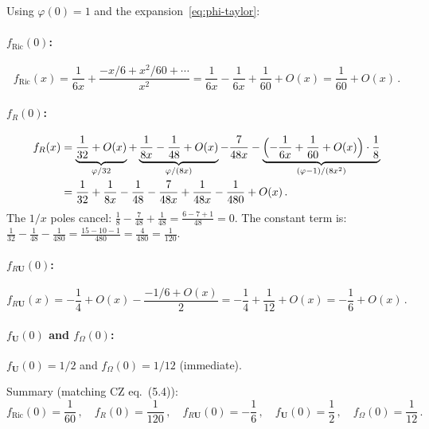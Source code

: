 \documentclass[11pt,a4paper]{article}
\theoremstyle{definition}
\theoremstyle{remark}
\begin{document}
Using $\varphi(0) = 1$ and the expansion~\eqref{eq:phi-taylor}:

\paragraph{$f_{\text{Ric}}(0)$:}
\begin{equation*}
  f_{\text{Ric}}(x) = \frac{1}{6x}
  + \frac{-x/6 + x^2/60 + \cdots}{x^2}
  = \frac{1}{6x} - \frac{1}{6x} + \frac{1}{60} + O(x)
  = \frac{1}{60} + O(x)\,.
\end{equation*}

\paragraph{$f_R(0)$:}
\begin{align*}
  f_R(x) &= \underbrace{\frac{1}{32} + O(x)}_{\varphi/32}
  + \underbrace{\frac{1}{8x} - \frac{1}{48} + O(x)}_{\varphi/(8x)}
  - \frac{7}{48x}
  - \underbrace{\Bigl(-\frac{1}{6x} + \frac{1}{60} + O(x)\Bigr)
    \cdot \frac{1}{8}}_{(\varphi-1)/(8x^2)}\\
  &= \frac{1}{32} + \frac{1}{8x} - \frac{1}{48} - \frac{7}{48x}
  + \frac{1}{48x} - \frac{1}{480} + O(x)\,.
\end{align*}
The $1/x$ poles cancel:
$\frac{1}{8} - \frac{7}{48} + \frac{1}{48}
= \frac{6 - 7 + 1}{48} = 0$.
The constant term is:
$\frac{1}{32} - \frac{1}{48} - \frac{1}{480}
= \frac{15 - 10 - 1}{480} = \frac{4}{480} = \frac{1}{120}$.

\paragraph{$f_{R\mathbf{U}}(0)$:}
\begin{equation*}
  f_{R\mathbf{U}}(x) = -\frac{1}{4} + O(x)
  - \frac{-1/6 + O(x)}{2}
  = -\frac{1}{4} + \frac{1}{12} + O(x)
  = -\frac{1}{6} + O(x)\,.
\end{equation*}

\paragraph{$f_{\mathbf{U}}(0)$ and $f_\Omega(0)$:}
$f_{\mathbf{U}}(0) = 1/2$ and $f_\Omega(0) = 1/12$ (immediate).

\medskip
\noindent Summary (matching CZ eq.~(5.4)):
\begin{equation}
  \boxed{
  f_{\text{Ric}}(0) = \frac{1}{60}\,,\quad
  f_R(0) = \frac{1}{120}\,,\quad
  f_{R\mathbf{U}}(0) = -\frac{1}{6}\,,\quad
  f_{\mathbf{U}}(0) = \frac{1}{2}\,,\quad
  f_\Omega(0) = \frac{1}{12}\,.
  }
  \label{eq:f-at-0}
\end{equation}
\end{document}
